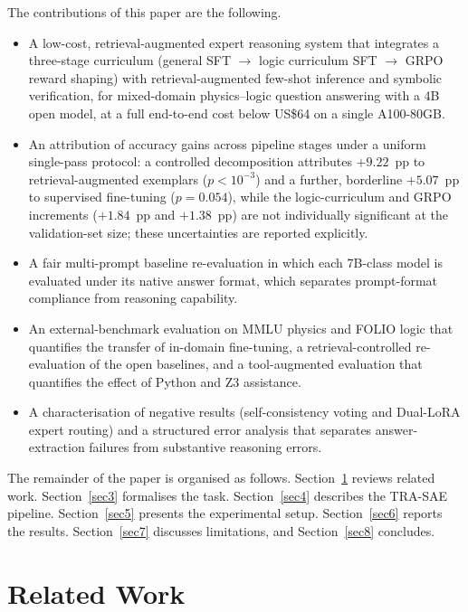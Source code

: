 \documentclass[APA,twocolumn]{USG}
\newcommand{\modelname}{TRA-SAE}
\begin{document}
The contributions of this paper are the following.
\begin{itemize}
\item A low-cost, retrieval-augmented expert reasoning system that integrates a
three-stage curriculum (general SFT $\rightarrow$ logic curriculum SFT
$\rightarrow$ GRPO reward shaping) with retrieval-augmented few-shot inference and
symbolic verification, for mixed-domain physics--logic question answering with a
4B open model, at a full end-to-end cost below US\$64 on a single A100-80GB.
\item An attribution of accuracy gains across pipeline stages under a uniform
single-pass protocol: a controlled decomposition attributes $+9.22$~pp to
retrieval-augmented exemplars ($p<10^{-3}$) and a further, borderline $+5.07$~pp
to supervised fine-tuning ($p=0.054$), while the logic-curriculum and GRPO
increments ($+1.84$~pp and $+1.38$~pp) are not individually significant at the
validation-set size; these uncertainties are reported explicitly.
\item A fair multi-prompt baseline re-evaluation in which each 7B-class model is
evaluated under its native answer format, which separates prompt-format
compliance from reasoning capability.
\item An external-benchmark evaluation on MMLU physics and FOLIO logic that
quantifies the transfer of in-domain fine-tuning, a retrieval-controlled
re-evaluation of the open baselines, and a tool-augmented evaluation that
quantifies the effect of Python and Z3 assistance.
\item A characterisation of negative results (self-consistency voting and
Dual-LoRA expert routing) and a structured error analysis that separates
answer-extraction failures from substantive reasoning errors.
\end{itemize}

The remainder of the paper is organised as follows.
Section~\ref{sec2} reviews related work. Section~\ref{sec3} formalises the task.
Section~\ref{sec4} describes the \modelname{} pipeline. Section~\ref{sec5}
presents the experimental setup. Section~\ref{sec6} reports the results.
Section~\ref{sec7} discusses limitations, and Section~\ref{sec8} concludes.

\section{Related Work}\label{sec2}
\end{document}
